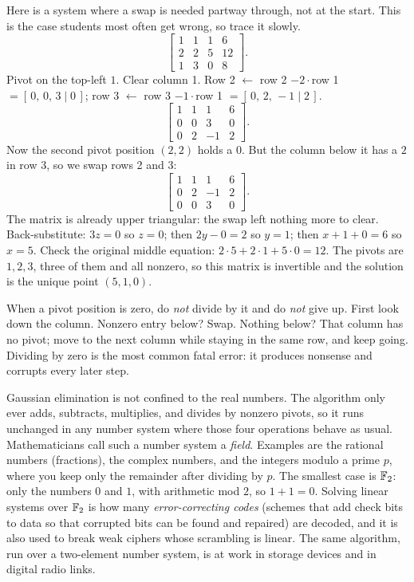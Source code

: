 Here is a system where a swap is needed partway through, not at the start.
This is the case students most often get wrong, so trace it slowly.
\[
\left[\begin{array}{ccc|c}
1 & 1 & 1 & 6\\
2 & 2 & 5 & 12\\
1 & 3 & 0 & 8
\end{array}\right].
\]
Pivot on the top-left $1$. Clear column 1. Row 2 $\leftarrow$ row 2 $-2\cdot$row
1 $= [\,0,\,0,\,3\mid 0\,]$; row 3 $\leftarrow$ row 3 $-1\cdot$row 1 $=
[\,0,\,2,\,-1\mid 2\,]$.
\[
\left[\begin{array}{ccc|c}
1 & 1 & 1 & 6\\
0 & 0 & 3 & 0\\
0 & 2 & -1 & 2
\end{array}\right].
\]
Now the second pivot position $(2,2)$ holds a $0$. But the column below it has a
$2$ in row 3, so we swap rows 2 and 3:
\[
\left[\begin{array}{ccc|c}
1 & 1 & 1 & 6\\
0 & 2 & -1 & 2\\
0 & 0 & 3 & 0
\end{array}\right].
\]
The matrix is already upper triangular: the swap left nothing more to clear.
Back-substitute: $3z = 0$ so $z = 0$; then $2y - 0 = 2$ so $y = 1$; then
$x + 1 + 0 = 6$ so $x = 5$. Check the original middle equation:
$2\cdot 5 + 2\cdot 1 + 5\cdot 0 = 12$. The pivots are
$1,2,3$, three of them and all nonzero, so this matrix is invertible and the
solution is the unique point $(5,1,0)$.

\begin{trapbox}
When a pivot position is zero, do \emph{not} divide by it and do \emph{not} give
up. First look down the column. Nonzero entry below? Swap. Nothing below? That
column has no pivot; move to the next column while
staying in the same row, and keep going. Dividing by zero is the most
common fatal error: it produces nonsense and corrupts every later step.
\end{trapbox}

\begin{connectionbox}
Gaussian elimination is not confined to the real numbers. The algorithm only
ever adds, subtracts, multiplies, and divides by nonzero pivots,
so it runs unchanged in any number system where those four operations behave as
usual. Mathematicians call such a number system a \emph{field}. Examples are the
rational numbers (fractions), the complex numbers,
and the integers modulo a prime $p$, where you keep only the remainder after
dividing by $p$. The smallest case is
$\mathbb{F}_2$: only the numbers $0$ and $1$, with arithmetic mod $2$, so $1+1=0$.
Solving linear systems over $\mathbb{F}_2$ is how many \emph{error-correcting codes}
(schemes that add check bits to data so that corrupted bits can be found and
repaired) are decoded, and it is also used to break weak ciphers whose
scrambling is linear. The same algorithm, run over a two-element
number system, is at work in storage devices and in digital radio links.
\end{connectionbox}

